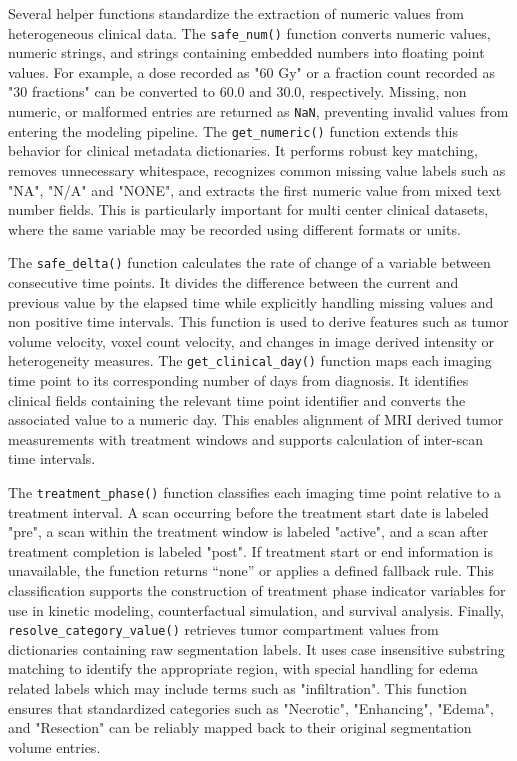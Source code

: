 Several helper functions standardize the extraction of numeric values from heterogeneous clinical data. The \texttt{safe\_num()} function converts numeric values, numeric strings, and strings containing embedded numbers into floating point values. For example, a dose recorded as "60 Gy" or a fraction count recorded as "30 fractions" can be converted to 60.0 and 30.0, respectively. Missing, non numeric, or malformed entries are returned as \texttt{NaN}, preventing invalid values from entering the modeling pipeline. The \texttt{get\_numeric()} function extends this behavior for clinical metadata dictionaries. It performs robust key matching, removes unnecessary whitespace, recognizes common missing value labels such as "NA", "N/A" and "NONE", and extracts the first numeric value from mixed text number fields. This is particularly important for multi center clinical datasets, where the same variable may be recorded using different formats or units.

The \texttt{safe\_delta()} function calculates the rate of change of a variable between consecutive time points. It divides the difference between the current and previous value by the elapsed time while explicitly handling missing values and non positive time intervals. This function is used to derive features such as tumor volume velocity, voxel count velocity, and changes in image derived intensity or heterogeneity measures. The \texttt{get\_clinical\_day()} function maps each imaging time point to its corresponding number of days from diagnosis. It identifies clinical fields containing the relevant time point identifier and converts the associated value to a numeric day. This enables alignment of MRI derived tumor measurements with treatment windows and supports calculation of inter-scan time intervals.

The \texttt{treatment\_phase()} function classifies each imaging time point relative to a treatment interval. A scan occurring before the treatment start date is labeled "pre", a scan within the treatment window is labeled "active", and a scan after treatment completion is labeled "post". If treatment start or end information is unavailable, the function returns ``none'' or applies a defined fallback rule. This classification supports the construction of treatment phase indicator variables for use in kinetic modeling, counterfactual simulation, and survival analysis. Finally, \texttt{resolve\_category\_value()} retrieves tumor compartment values from dictionaries containing raw segmentation labels. It uses case insensitive substring matching to identify the appropriate region, with special handling for edema related labels which may include terms such as "infiltration". This function ensures that standardized categories such as "Necrotic", "Enhancing", "Edema", and "Resection" can be reliably mapped back to their original segmentation volume entries.

